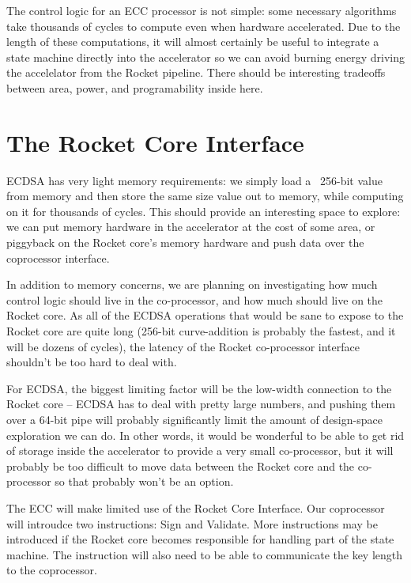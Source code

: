 \documentclass[twocolumn]{article}
\begin{document}
The control logic for an ECC processor is not simple: some necessary
algorithms take thousands of cycles\cite{mmm-hw_ecc} to compute even
when hardware accelerated.  Due to the length of these computations,
it will almost certainly be useful to integrate a state machine
directly into the accelerator so we can avoid burning 
energy driving the accelelator from the Rocket pipeline.  There should
be interesting tradeoffs between area, power, and programability
inside here.

\section{The Rocket Core Interface}

ECDSA has very light memory requirements: we simply load a ~256-bit
value from memory and then store the same size value out to memory,
while computing on it for thousands of cycles.  This should provide an
interesting space to explore: we can put memory hardware in the
accelerator at the cost of some area, or piggyback on the Rocket
core's memory hardware and push data over the coprocessor interface.

In addition to memory concerns, we are planning on investigating how
much control logic should live in the co-processor, and how much
should live on the Rocket core.  As all of the ECDSA operations that
would be sane to expose to the Rocket core are quite long (256-bit
curve-addition is probably the fastest, and it will be dozens of
cycles), the latency of the Rocket co-processor interface shouldn't be
too hard to deal with.

For ECDSA, the biggest limiting factor will be the low-width
connection to the Rocket core -- ECDSA has to deal with pretty large
numbers, and pushing them over a 64-bit pipe will probably
significantly limit the amount of design-space exploration we can do.
In other words, it would be wonderful to be able to get rid of storage
inside the accelerator to provide a very small co-processor, but it
will probably be too difficult to move data between the Rocket core
and the co-processor so that probably won't be an option.

The ECC will make limited use of the Rocket Core Interface. Our 
coprocessor will introudce two instructions: Sign and Validate. More
instructions may be introduced if the Rocket core becomes responsible
for handling part of the state machine. The instruction will also need
to be able to communicate the key length to the coprocessor. 
\end{document}
